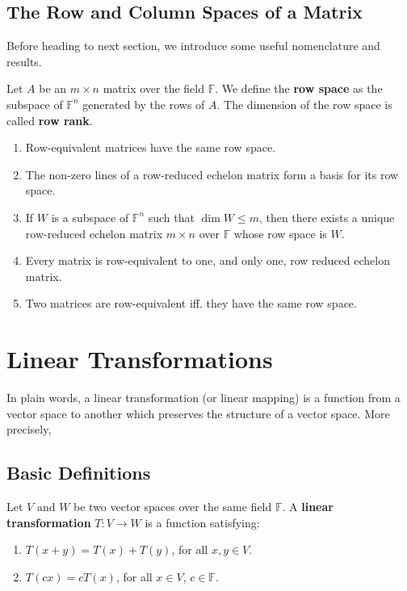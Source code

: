 \subsection*{The Row and Column Spaces of a Matrix}

Before heading to next section, we introduce some useful nomenclature and results.

\begin{definition}
	Let $A$ be an $m \times n$ matrix over the field $\mathbb{F}$. We define the \textbf{row space} as the subspace of $\mathbb{F}^n$ generated by the rows of $A$. The dimension of the row space is called \textbf{row rank}.
\end{definition}

\begin{theorem} \hfill
	\begin{enumerate}
		\item Row-equivalent matrices have the same row space.
		\item The non-zero lines of a row-reduced echelon matrix form a basis for its row space.
		\item If $W$ is a subspace of $\mathbb{F}^n$ such that $\dim W \leq m$, then there exists a unique row-reduced echelon matrix $m \times n$ over $\mathbb{F}$ whose row space is $W$.
		\item Every matrix is row-equivalent to one, and only one, row reduced echelon matrix.
		\item Two matrices are row-equivalent iff. they have the same row space.
	\end{enumerate}
\end{theorem}
 
\section{Linear Transformations}

In plain words, a linear transformation (or linear mapping) is a function from a vector space to another which preserves the structure of a vector space. More precisely,

\subsection*{Basic Definitions}

\begin{definition}
	Let $V$ and $W$ be two vector spaces over the same field $\mathbb{F}$. A \textbf{linear transformation} $T : V \longrightarrow W$ is a function satisfying:
	\begin{enumerate}
		\item $T(x+y) = T(x) + T(y)$, for all $x,y \in V$.
		\item $T(c x) = c T(x)$, for all $x \in V$, $c \in \mathbb{F}$.
	\end{enumerate}
\end{definition}

